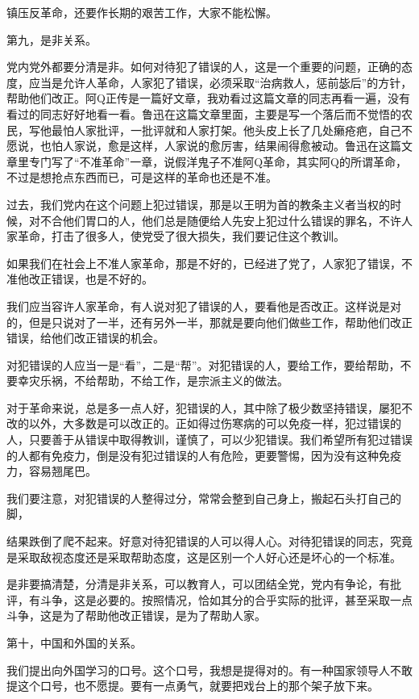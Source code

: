 镇压反革命，还要作长期的艰苦工作，大家不能松懈。

第九，是非关系。

党内党外都要分清是非。如何对待犯了错误的人，这是一个重要的问题，正确的态度，应当是允许人革命，人家犯了错误，必须采取“治病救人，惩前毖后”的方针，帮助他们改正。阿Q正传是一篇好文章，我劝看过这篇文章的同志再看一遍，没有看过的同志好好地看一看。鲁迅在这篇文章里面，主要是写一个落后而不觉悟的农民，写他最怕人家批评，一批评就和人家打架。他头皮上长了几处癞疮疤，自己不愿说，也怕人家说，愈是这样，人家说的愈厉害，结果闹得愈被动。鲁迅在这篇文章里专门写了“不准革命”一章，说假洋鬼子不准阿Q革命，其实阿Q的所谓革命，不过是想抢点东西而已，可是这样的革命也还是不准。

过去，我们党内在这个问题上犯过错误，那是以王明为首的教条主义者当权的时候，对不合他们胃口的人，他们总是随便给人先安上犯过什么错误的罪名，不许人家革命，打击了很多人，使党受了很大损失，我们要记住这个教训。

如果我们在社会上不准人家革命，那是不好的，已经进了党了，人家犯了错误，不准他改正错误，也是不好的。

我们应当容许人家革命，有人说对犯了错误的人，要看他是否改正。这样说是对的，但是只说对了一半，还有另外一半，那就是要向他们做些工作，帮助他们改正错误，给他们改正错误的机会。

对犯错误的人应当一是“看”，二是“帮”。对犯错误的人，要给工作，要给帮助，不要幸灾乐祸，不给帮助，不给工作，是宗派主义的做法。

对于革命来说，总是多一点人好，犯错误的人，其中除了极少数坚持错误，屡犯不改的以外，大多数是可以改正的。正如得过伤寒病的可以免疫一样，犯过错误的人，只要善于从错误中取得教训，谨慎了，可以少犯错误。我们希望所有犯过错误的人都有免疫力，倒是没有犯过错误的人有危险，更要警惕，因为没有这种免疫力，容易翘尾巴。

我们要注意，对犯错误的人整得过分，常常会整到自己身上，搬起石头打自己的脚，

结果跌倒了爬不起来。好意对待犯错误的人可以得人心。对待犯错误的同志，究竟是采取敌视态度还是采取帮助态度，这是区别一个人好心还是坏心的一个标准。

是非要搞清楚，分清是非关系，可以教育人，可以团结全党，党内有争论，有批评，有斗争，这是必要的。按照情况，恰如其分的合乎实际的批评，甚至采取一点斗争，这是为了帮助他改正错误，是为了帮助人家。

第十，中国和外国的关系。

我们提出向外国学习的口号。这个口号，我想是提得对的。有一种国家领导人不敢提这个口号，也不愿提。要有一点勇气，就要把戏台上的那个架子放下来。

